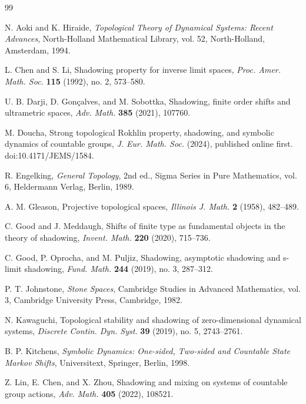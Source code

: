 \documentclass[12pt]{amsart}
\theoremstyle{definition}
\numberwithin{equation}{section}
\theoremstyle{remark}
\begin{document}
\begin{thebibliography}{99}

N. Aoki and K. Hiraide,
\newblock \emph{Topological Theory of Dynamical Systems: Recent Advances},
\newblock North-Holland Mathematical Library, vol. 52, North-Holland, Amsterdam, 1994.

L. Chen and S. Li,
\newblock Shadowing property for inverse limit spaces,
\newblock \emph{Proc. Amer. Math. Soc.} \textbf{115} (1992), no. 2, 573--580.

U. B. Darji, D. Gon\c{c}alves, and M. Sobottka,
\newblock Shadowing, finite order shifts and ultrametric spaces,
\newblock \emph{Adv. Math.} \textbf{385} (2021), 107760.

M. Doucha,
\newblock Strong topological Rokhlin property, shadowing, and symbolic dynamics
of countable groups,
\newblock \emph{J. Eur. Math. Soc.} (2024), published online first.
\newblock doi:10.4171/JEMS/1584.

R. Engelking,
\newblock \emph{General Topology},
\newblock 2nd ed., Sigma Series in Pure Mathematics, vol. 6,
Heldermann Verlag, Berlin, 1989.

A. M. Gleason,
\newblock Projective topological spaces,
\newblock \emph{Illinois J. Math.} \textbf{2} (1958), 482--489.

C. Good and J. Meddaugh,
\newblock Shifts of finite type as fundamental objects in the theory of
shadowing,
\newblock \emph{Invent. Math.} \textbf{220} (2020), 715--736.

C. Good, P. Oprocha, and M. Puljiz,
\newblock Shadowing, asymptotic shadowing and s-limit shadowing,
\newblock \emph{Fund. Math.} \textbf{244} (2019), no. 3, 287--312.

P. T. Johnstone,
\newblock \emph{Stone Spaces},
\newblock Cambridge Studies in Advanced Mathematics, vol. 3,
Cambridge University Press, Cambridge, 1982.

N. Kawaguchi,
\newblock Topological stability and shadowing of zero-dimensional dynamical
systems,
\newblock \emph{Discrete Contin. Dyn. Syst.} \textbf{39} (2019), no. 5, 2743--2761.

B. P. Kitchens,
\newblock \emph{Symbolic Dynamics: One-sided, Two-sided and Countable State
Markov Shifts},
\newblock Universitext, Springer, Berlin, 1998.

Z. Lin, E. Chen, and X. Zhou,
\newblock Shadowing and mixing on systems of countable group actions,
\newblock \emph{Adv. Math.} \textbf{405} (2022), 108521.


\end{thebibliography}
\end{document}
